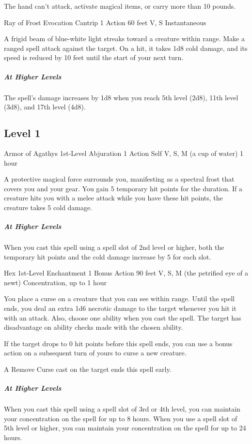 {The hand can’t attack, activate magical items, or carry more than 10 pounds.

\DndSpellHeader
	{Ray of Frost}
	{Evocation Cantrip}
	{1 Action}
	{60 feet}
	{V, S}
	{Instantaneous}

A frigid beam of blue-white light streaks toward a creature within range. Make a ranged spell attack against the target. On a hit, it takes 1d8 cold damage, and its speed is reduced by 10 feet until the start of your next turn.

\subparagraph*{At Higher Levels} The spell’s damage increases by 1d8 when you reach 5th level (2d8), 11th level (3d8), and 17th level (4d8).

\subsection*{Level 1}

\DndSpellHeader
	{Armor of Agathys}
	{1st-Level Abjuration}
	{1 Action}
	{Self}
	{V, S, M (a cup of water)}
	{1 hour}

A protective magical force surrounds you, manifesting as a spectral frost that covers you and your gear. You gain 5 temporary hit points for the duration. If a creature hits you with a melee attack while you have these hit points, the creature takes 5 cold damage.

\subparagraph*{At Higher Levels} When you cast this spell using a spell slot of 2nd level or higher, both the temporary hit points and the cold damage increase by 5 for each slot.

\DndSpellHeader
	{Hex}
	{1st-Level Enchantment}
	{1 Bonus Action}
	{90 feet}
	{V, S, M (the petrified eye of a newt)}
	{Concentration, up to 1 hour}

You place a curse on a creature that you can see within range. Until the spell ends, you deal an extra 1d6 necrotic damage to the target whenever you hit it with an attack. Also, choose one ability when you cast the spell. The target has disadvantage on ability checks made with the chosen ability.

If the target drops to 0 hit points before this spell ends, you can use a bonus action on a subsequent turn of yours to curse a new creature.

A Remove Curse cast on the target ends this spell early.

\subparagraph*{At Higher Levels} When you cast this spell using a spell slot of 3rd or 4th level, you can maintain your concentration on the spell for up to 8 hours. When you use a spell slot of 5th level or higher, you can maintain your concentration on the spell for up to 24 hours.

}
